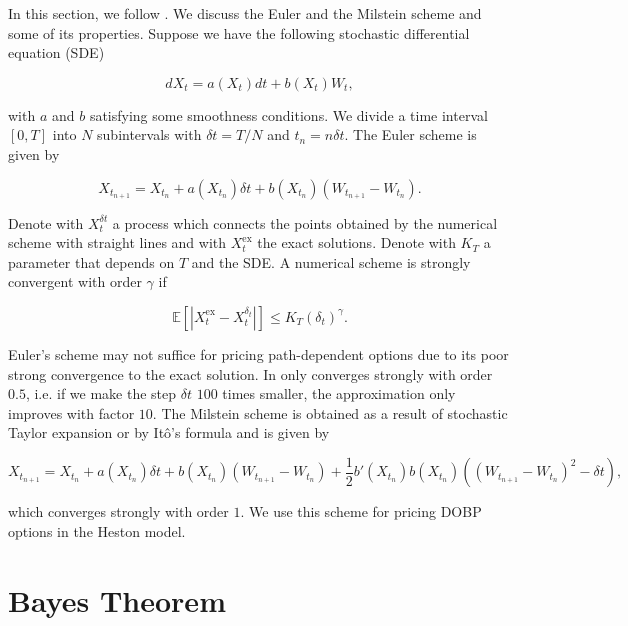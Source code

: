 \documentclass[12pt,a4paper,oneside]{book}
\begin{document}
In this section, we follow \cite{palczewski2016numerical}. We discuss the Euler and the Milstein scheme and some of its properties. Suppose we have the following stochastic differential equation (SDE) 

\begin{equation}
dX_t = a(X_t) dt + b(X_t) W_t,
\end{equation}

with $a$ and $b$ satisfying some smoothness conditions. We divide a time interval $[0,T]$ into $N$ subintervals with $\delta t = T /N$ and $t_n = n \delta t$. The Euler scheme is given by 

\begin{equation}
X_{t_{n+1}} = X_{t_n} + a(X_{t_n}) \delta t + b(X_{t_n}) (W_{t_{n+1}} - W_{t_n}) .
\end{equation}

Denote with $X_t^{\delta t}$ a process which connects the
points obtained by the numerical scheme with straight lines and with $X_t^{\text{ex}}$ the exact solutions. Denote with $K_T$ a parameter that depends on $T$ and the SDE. A numerical scheme is strongly convergent with order $\gamma$ if

\begin{equation}
\mathbb{E } \left[ |X_t^{\text{ex}} - X_t^{\delta_t}| \right] \leq K_T (\delta_t)^{\gamma}.
\end{equation}



Euler's scheme may not suffice for pricing path-dependent options due to its poor strong convergence to the exact solution. In only converges strongly with order $0.5$, i.e. if we make the step $\delta t$ $100$ times smaller, the approximation only improves with factor $10$.  The Milstein scheme is  obtained as a result of stochastic Taylor expansion or by It\^{o}'s formula and is given by 

\begin{equation}
X_{t_{n+1}} = X_{t_n} + a(X_{t_n}) \delta t + b(X_{t_n}) (W_{t_{n+1}} - W_{t_n}) + \dfrac{1}{2} b' (X_{t_n}) b(X_{t_n}) \left((W_{t_{n+1}} - W_{t_n})^2 - \delta t\right),
\end{equation}

which converges strongly with order $1$. We use this scheme for pricing DOBP options in the Heston model. 


\section{Bayes Theorem}
\end{document}

